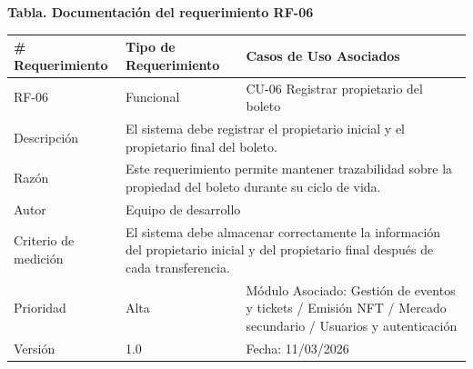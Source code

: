 \documentclass[12pt,letterpaper]{article}
\begin{document}
\noindent
\begin{minipage}{\textwidth}
\centering
\scriptsize
\renewcommand{\arraystretch}{0.9}
\setlength{\tabcolsep}{3pt}
\setlength{\arrayrulewidth}{0.5pt}

\textbf{Tabla. Documentación del requerimiento RF-06}

\vspace{2pt}

\begin{tabularx}{\textwidth}{|p{2.6cm}|X|p{3.4cm}|}
\hline
\# Requerimiento & Tipo de Requerimiento & Casos de Uso Asociados \\ \hline
RF-06 & Funcional & CU-06 Registrar propietario del boleto \\ \hline
Descripción & \multicolumn{2}{X|}{El sistema debe registrar el propietario inicial y el propietario final del boleto.} \\ \hline
Razón & \multicolumn{2}{X|}{Este requerimiento permite mantener trazabilidad sobre la propiedad del boleto durante su ciclo de vida.} \\ \hline
Autor & \multicolumn{2}{X|}{Equipo de desarrollo} \\ \hline
Criterio de medición & \multicolumn{2}{X|}{El sistema debe almacenar correctamente la información del propietario inicial y del propietario final después de cada transferencia.} \\ \hline
Prioridad & Alta & Módulo Asociado: Gestión de eventos y tickets / Emisión NFT / Mercado secundario / Usuarios y autenticación \\ \hline
Versión & 1.0 & Fecha: 11/03/2026 \\ \hline
\end{tabularx}
\end{minipage}

\vspace{0.2cm}
\end{document}

